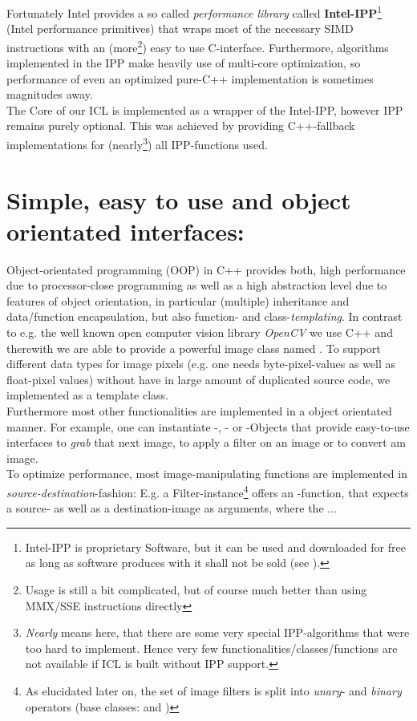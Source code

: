 \begin{enumerate}
Fortunately Intel provides a so called \emph{performance library} called \textbf{Intel-IPP}\footnote{Intel-IPP is proprietary Software, but it can be used and downloaded  for free as long as software produces with it shall not be sold (see ).} (Intel performance primitives) that wraps most of the necessary SIMD instructions with an (more\footnote{Usage is still a bit complicated, but of course much better than using MMX/SSE instructions directly}) easy to use C-interface. Furthermore, algorithms implemented in the IPP make heavily use of multi-core optimization, so performance of even an optimized pure-C++ implementation is sometimes magnitudes away.\\
The Core of our ICL is implemented as a wrapper of the Intel-IPP, however IPP remains purely optional. This was achieved by providing C++-fallback implementations for (nearly\footnote{\emph{Nearly} means here, that there are some very special IPP-algorithms that were too hard to implement. Hence very few functionalities/classes/functions are not available if ICL is built without IPP support.}) all IPP-functions used. 
\end{enumerate}

\section{Simple, easy to use and object orientated interfaces:}
Object-orientated programming (OOP) in C++ provides both, high performance due to processor-close programming as well as a high abstraction level due to features of object orientation, in particular (multiple) inheritance and data/function encapsulation, but also function- and class-\emph{templating}. In contrast to e.g. the well known open computer vision library \emph{OpenCV} we use C++ and therewith we are able to provide a powerful image class named . To support different data types for image pixels (e.g. one needs byte-pixel-values as well as float-pixel values) without have in large amount of duplicated source code, we implemented  as a template class.\\
Furthermore most other functionalities are implemented in a object orientated manner. For example, one can instantiate  -, - or -Objects that provide easy-to-use interfaces to \emph{grab} that next image, to apply a filter on an image or to convert am image.\\
To optimize performance, most image-manipulating functions are implemented in \emph{source-destination}-fashion: E.g. a Filter-instance\footnote{As elucidated later on, the set of image filters is split into \emph{unary}- and \emph{binary} operators (base classes:  and )} offers an -function, that expects a source- as well as a destination-image as arguments, where the ... 
